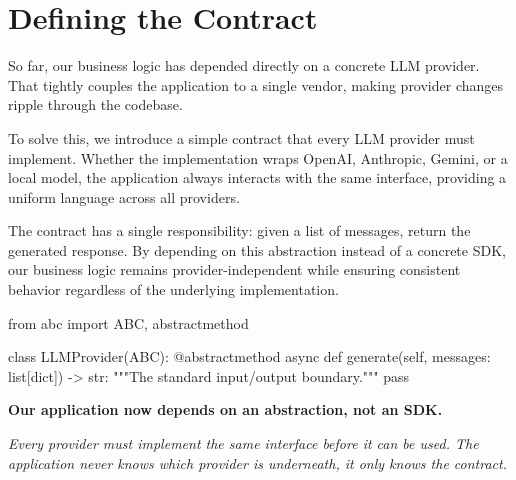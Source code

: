 \documentclass[11pt]{article}
\begin{document}
\newpage

\section*{Defining the Contract}
\vspace{0.15in}

So far, our business logic has depended directly on a concrete LLM provider. That tightly couples the application to a single vendor, making provider changes ripple through the codebase.

\vspace{0.1in}

To solve this, we introduce a simple contract that every LLM provider must implement. Whether the implementation wraps OpenAI, Anthropic, Gemini, or a local model, the application always interacts with the same interface, providing a uniform language across all providers.


\vspace{0.1in}

The contract has a single responsibility: given a list of messages, return the generated response. By depending on this abstraction instead of a concrete SDK, our business logic remains provider-independent while ensuring consistent behavior regardless of the underlying implementation.

\vspace{0.1in}

\begin{codebox}
from abc import ABC, abstractmethod

class LLMProvider(ABC):
    @abstractmethod
    async def generate(self, messages: list[dict]) -> str:
        """The standard input/output boundary."""
        pass
\end{codebox}

\vspace{0.4in}

\begin{center}
\color{brandnavy}
\Large\textbf{Our application now depends on an abstraction, not an SDK.}

\vspace{0.12in}

\color{brandgray}
\large\textit{Every provider must implement the same interface before it can be used.
The application never knows which provider is underneath, it only knows the contract.}
\end{center}
\end{document}
